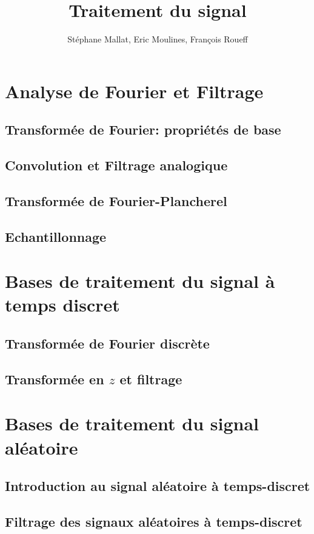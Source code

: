 \documentclass[[a4paper,10pt]{book}              %
\title{Traitement du signal}
\author{St\'ephane Mallat, Eric Moulines, François Roueff}
\begin{document}
\maketitle
\tableofcontents
\part{Analyse de Fourier et Filtrage}
\chapter{Transformée de Fourier: propriétés de base}


\chapter{Convolution et Filtrage analogique}

\chapter{Transformée de Fourier-Plancherel}

\chapter{Echantillonnage}

\part{Bases de traitement du signal à temps discret}
\chapter{Transformée de Fourier discrète}
\label{discret-chap}

\chapter{Transformée en $z$ et filtrage}

\part{Bases de traitement du signal al\'eatoire}
\chapter{Introduction au signal al\'eatoire \`a temps-discret}


\chapter{Filtrage des signaux al\'eatoires \`a temps-discret}

\end{document}

